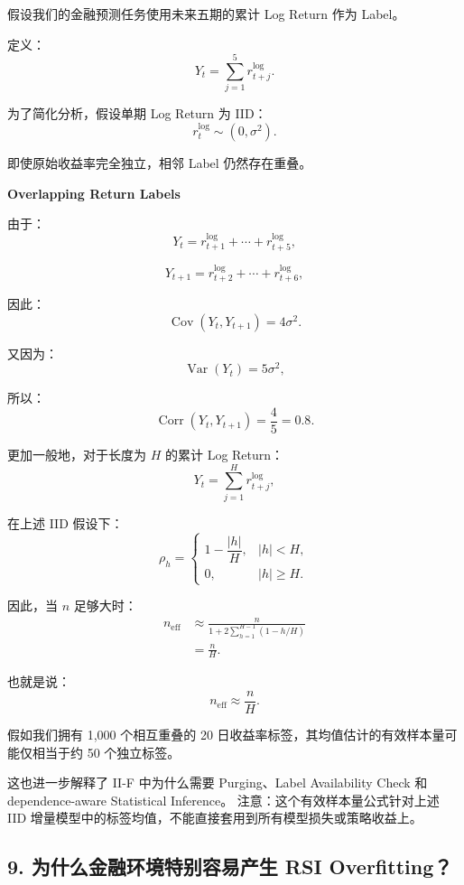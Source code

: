 假设我们的金融预测任务使用未来五期的累计 Log Return 作为 Label。

定义：
\[Y_t=\sum_{j=1}^{5}r_{t+j}^{\log}.\]

为了简化分析，假设单期 Log Return 为 IID：
\[r_t^{\log}\sim(0,\sigma^2).\]

即使原始收益率完全独立，相邻 Label 仍然存在重叠。

\textbf{Overlapping Return Labels}


由于：
\[Y_t=r_{t+1}^{\log}+\cdots+r_{t+5}^{\log},\]

\[Y_{t+1}=r_{t+2}^{\log}+\cdots+r_{t+6}^{\log},\]

因此：
\[\operatorname{Cov}(Y_t,Y_{t+1})
=
4\sigma^2.\]

又因为：
\[\operatorname{Var}(Y_t)=5\sigma^2,\]

所以：
\[\boxed{
\operatorname{Corr}(Y_t,Y_{t+1})
=
\frac45=0.8.
}\]

更加一般地，对于长度为 \(H\) 的累计 Log Return：
\[Y_t=\sum_{j=1}^{H}r_{t+j}^{\log},\]

在上述 IID 假设下：
\[\boxed{
\rho_h=
\begin{cases}
1-\dfrac{|h|}{H},&|h|<H,\\
0,&|h|\geq H.
\end{cases}
}\]

因此，当 \(n\) 足够大时：
\[\begin{aligned}
n_{\mathrm{eff}}
&\approx
\frac{n}{
1+2\sum_{h=1}^{H-1}(1-h/H)
}\\
&=\frac{n}{H}.
\end{aligned}\]

也就是说：
\[\boxed{
n_{\mathrm{eff}}\approx\frac nH.
}\]

假如我们拥有 1,000 个相互重叠的 20 日收益率标签，其均值估计的有效样本量可能仅相当于约 50 个独立标签。

这也进一步解释了 II-F 中为什么需要 Purging、Label Availability Check 和 dependence-aware Statistical Inference。 注意：这个有效样本量公式针对上述 IID 增量模型中的标签均值，不能直接套用到所有模型损失或策略收益上。

\hypertarget{part-4-58-0007-ux4e3aux4ec0ux4e48ux91d1ux878dux73afux5883ux7279ux522bux5bb9ux6613ux4ea7ux751f-rsi-overfitting}{%
\subsection{9. 为什么金融环境特别容易产生 RSI Overfitting？}\label{part-4-58-0007-ux4e3aux4ec0ux4e48ux91d1ux878dux73afux5883ux7279ux522bux5bb9ux6613ux4ea7ux751f-rsi-overfitting}}

